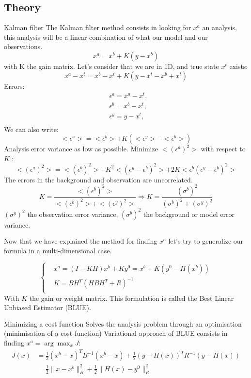 \subsection{Theory}
\begin{frame}[allowframebreaks]{Kalman filter}
    The Kalman filter method consists in looking for $x^a$ an analysis, this analysis will be a linear combination of what our model and our observations.
    $$x^a=x^b+K(y-x^b)$$
    with K the gain matrix.
    \newline Let’s consider that we are in 1D, and true state $x^t$ exists:
    $$x^a-x^t=x^b-x^t+K(y-x^t-x^b+x^t)$$
	Errors:
    $$\begin{aligned}
        &\epsilon^a=x^a-x^t, \\
        &\epsilon^b=x^b-x^t, \\
        &\epsilon^y=y-x^t, \\
    \end{aligned}$$
    \newpage
    We can also write:
    $$<\epsilon^a>=<\epsilon^b>+K(<\epsilon^y>-<\epsilon^b>)$$
    Analysis error variance as low as possible.
    \newline Minimize $<(\epsilon^a)^2>$ with respect to $K$ :
    $$<(\epsilon^a)^2>=<(\epsilon^b)^2>+K^2<(\epsilon^y-\epsilon^b)^2>+2K<\epsilon^b(\epsilon^y-\epsilon^b)^2>$$
    The errors in the background and observation are uncorrelated.
    $$K=\frac{<(\epsilon^b)^2>}{<(\epsilon^b)^2>+<(\epsilon^y)^2>} \Rightarrow K=\frac{(\sigma^b)^2}{(\sigma^b)^2+(\sigma^y)^2} $$
    $(\sigma^y)^2$ the observation error variance, \newline $(\sigma^b)^2$ the background or model error variance.

	\newpage
    Now that we have explained the method for finding $x^a$ let's try to generalize our formula in a multi-dimensional case.

    $$\left\{\begin{aligned}
  &x^a=(I-KH)x^b+Ky^0=x^b+K(y^0-H(x^b)) \\
        &K=BH^T(HBH^T+R)^{-1} \\
 \end{aligned}\right.$$
    With $K$ the gain or weight matrix.
    This formulation is called the Best Linear Unbiased Estimator (BLUE).

	\newpage

\end{frame}
\begin{frame}{Minimizing a cost function}
    Solves the analysis problem through an optimisation (minimisation of a cost-function)
    Variational approach of BLUE consists in finding $x^a=\arg\max_{x}J$:
    $$\begin{aligned}
        J(x)&=\frac{1}{2}(x^b-x)^TB^{-1}(x^b-x)+\frac{1}{2}(y-H(x))^TR^{-1}(y-H(x)) \\
        &=\frac{1}{2}\|x-x^b\|_B^2+\frac{1}{2}\|H(x)-y^0\|_R^2
    \end{aligned}$$
	\begin{minipage}{\linewidth}
		\centering
	\end{minipage}
\end{frame}
